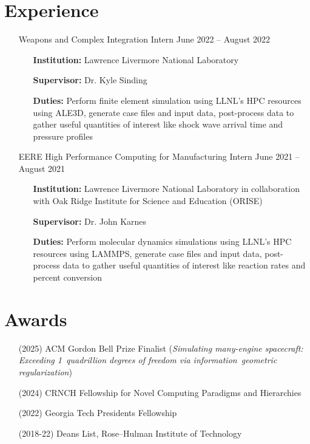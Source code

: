 \documentclass{article}
\begin{document}
\section{Experience}
\begin{itemize}
    \item[\faLandmark] Weapons and Complex Integration Intern \hfill June 2022 -- August 2022
    \begin{itemize}[leftmargin=0.875in]
        \setlength\itemsep{-0.3em}
        \item[\textbf{Institution:}] Lawrence Livermore National Laboratory
        \item[\textbf{Supervisor:}] Dr. Kyle Sinding
        \item[\textbf{Duties:}] Perform finite element simulation using LLNL's HPC resources using ALE3D, generate case files and input data, post-process data to gather useful quantities of interest like shock wave arrival time and pressure profiles
    \end{itemize}
    \item[\faLandmark]  EERE High Performance Computing for Manufacturing Intern \hfill June 2021 -- August 2021
    \begin{itemize}[leftmargin=0.875in]
        \setlength\itemsep{-0.3em}
        \item[\textbf{Institution:}] Lawrence Livermore National Laboratory in collaboration with Oak Ridge Institute for Science and Education (ORISE)
        \item[\textbf{Supervisor:}] Dr. John Karnes
        \item[\textbf{Duties:}] Perform molecular dynamics simulations using LLNL's HPC resources using LAMMPS, generate case files and input data, post-process data to gather useful quantities of interest like reaction rates and percent conversion

    \end{itemize}
\end{itemize}

\section{Awards}
\begin{itemize}
    \item[\faAward] (2025) ACM Gordon Bell Prize Finalist (\textit{Simulating many-engine spacecraft: Exceeding 1~quadrillion degrees of freedom via information~geometric regularization})
    \item[\faAward] (2024) CRNCH Fellowship for Novel Computing Paradigms and Hierarchies
    \item[\faAward] (2022) Georgia Tech Presidents Fellowship
    \item[\faAward] (2018-22) Deans List, Rose--Hulman Institute of Technology
\end{itemize}
\end{document}
